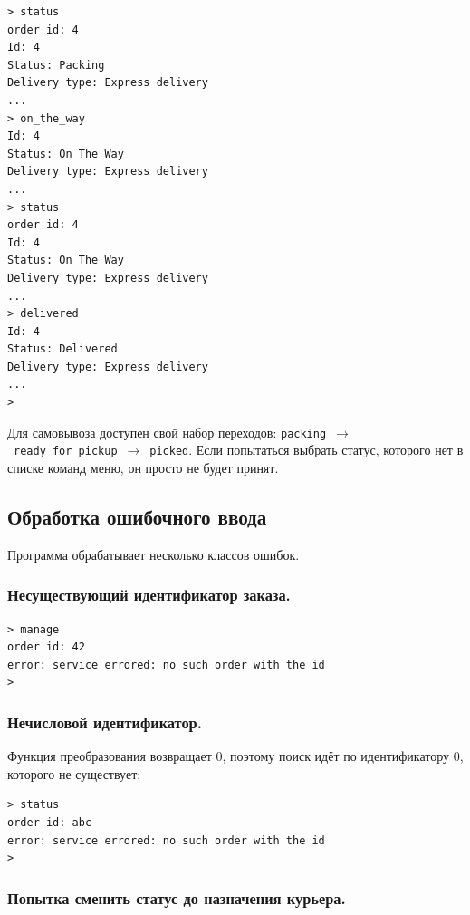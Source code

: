 \documentclass[12pt]{extarticle}
\renewcommand{\baselinestretch}{1.5}
\newcommand{\cmd}[1]{\texttt{#1}}
\begin{document}
\renewcommand{\baselinestretch}{1}
\begin{lstlisting}
> status
order id: 4
Id: 4
Status: Packing
Delivery type: Express delivery
...
> on_the_way
Id: 4
Status: On The Way
Delivery type: Express delivery
...
> status
order id: 4
Id: 4
Status: On The Way
Delivery type: Express delivery
...
> delivered
Id: 4
Status: Delivered
Delivery type: Express delivery
...
>
\end{lstlisting}
\renewcommand{\baselinestretch}{1.5}

Для самовывоза доступен свой набор переходов:
\cmd{packing}~$\to$~\cmd{ready\_for\_pickup}~$\to$~\cmd{picked}.
Если попытаться выбрать статус, которого нет в списке команд меню,
он просто не будет принят.

\subsection{Обработка ошибочного ввода}

Программа обрабатывает несколько классов ошибок.

\subsubsection*{Несуществующий идентификатор заказа.}

\renewcommand{\baselinestretch}{1}
\begin{lstlisting}
> manage
order id: 42
error: service errored: no such order with the id
>
\end{lstlisting}
\renewcommand{\baselinestretch}{1.5}

\subsubsection*{Нечисловой идентификатор.}

Функция преобразования возвращает 0, поэтому поиск идёт по
идентификатору 0, которого не существует:

\renewcommand{\baselinestretch}{1}
\begin{lstlisting}
> status
order id: abc
error: service errored: no such order with the id
>
\end{lstlisting}
\renewcommand{\baselinestretch}{1.5}

\subsubsection*{Попытка сменить статус до назначения курьера.}
\end{document}
